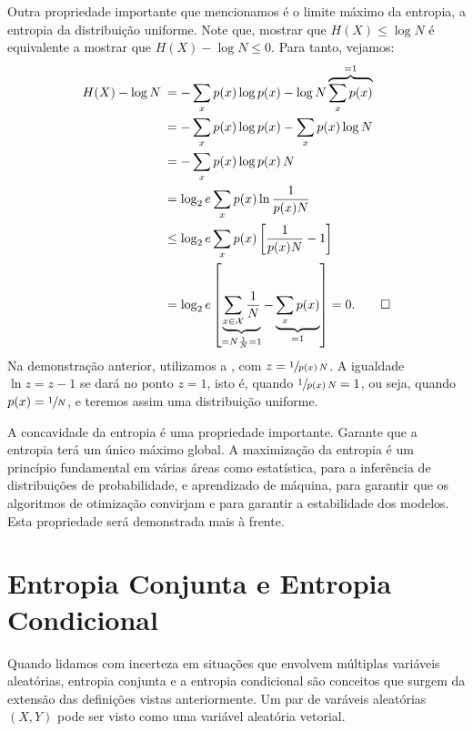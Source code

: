 Outra propriedade importante que mencionamos é o limite máximo da entropia,
a entropia da distribuição uniforme. Note que, mostrar que $H(X) \leq \log N$
é equivalente a mostrar que $H(X) - \log N \leq 0$. Para tanto, vejamos:
\begin{subequations}\label{eq:demlimentropy}
\begin{align}
H(X) - \log N \: &= - \sum_x p(x) \log p(x)  - \log N \overbrace{\sum_x p(x)}^{=1} \\
    &= - \sum_x p(x) \log p(x) - \sum_x p(x) \log N \\
    &= - \sum_x p(x) \log p(x) \, N \\
    &= \log_2 e \sum_x p(x) \ln \frac{1}{p(x) N} \\
    &\leq \log_2 e \sum_x p(x) \left[ \frac{1}{p(x) N} -1 \right] \\
    &= \log_2 e \left[ \underbrace{\sum_{x \in \mathcal{X}} \frac{1}{N}}_{= N \frac{1}{N} = 1} - \underbrace{\sum_x p(x)}_{=1} \right] = 0. \qed
\end{align}
\end{subequations}
Na demonstração anterior, utilizamos a , com $z = \sfrac{1}{p(x) \, N}$.
A igualdade $\ln z = z-1$ se dará no ponto $z = 1$, isto é, quando $\sfrac{1}{p(x) \, N} = 1$, ou seja,
quando $p(x) = \sfrac{1}{N}$, e teremos assim uma distribuição uniforme.

A concavidade da entropia é uma propriedade importante. Garante que a entropia
terá um único máximo global. A maximização da entropia é um princípio
fundamental em várias áreas como estatística, para a inferência de
distribuições de probabilidade, e aprendizado de máquina, para garantir que os
algoritmos de otimização convirjam e para garantir a estabilidade dos modelos.
Esta propriedade será demonstrada mais à frente.



\section{Entropia Conjunta e Entropia Condicional}\label{sec:entropiaconjunta}

Quando lidamos com incerteza em situações que envolvem múltiplas variáveis aleatórias,
entropia conjunta e a entropia condicional são conceitos que surgem da extensão das definições
vistas anteriormente. Um par de varáveis aleatórias $(X,Y)$ pode ser visto como
uma variável aleatória vetorial.

